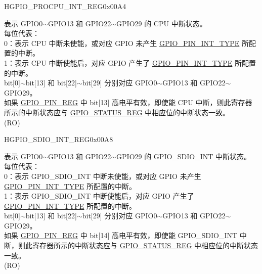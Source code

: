 \begin{register}{H}{GPIO\_PROCPU\_INT\_REG}{0x00A4}\label{regdesc:GPIOPROCPUINTREG}
%
\regnewline%
\begin{regdesc}\begin{reglist}
\label{fielddesc:GPIOPROCPUINT}\item [GPIO\_PROCPU\_INT] 表示 GPIO0$\sim$GPIO13 和 GPIO22$\sim$GPIO29 的 CPU 中断状态。\\ 
每位代表：\\
0：表示 CPU 中断未使能，或对应 GPIO 未产生 \hyperref[fielddesc:GPIOPINNINTTYPE]{GPIO\_PIN\_INT\_TYPE} 所配置的中断。\\
1：表示 CPU 中断使能后，对应 GPIO 产生了 \hyperref[fielddesc:GPIOPINNINTTYPE]{GPIO\_PIN\_INT\_TYPE} 所配置的中断。\\
bit[0]$\sim$bit[13] 和 bit[22]$\sim$bit[29] 分别对应 GPIO0$\sim$GPIO13 和 GPIO22$\sim$GPIO29。\\
如果 \hyperref[regdesc:GPIOPINNREG]{GPIO\_PIN\_REG} 中 bit[13] 高电平有效，即使能 CPU 中断，则此寄存器所示的中断状态应与 \hyperref[regdesc:GPIOSTATUSREG]{GPIO\_STATUS\_REG} 中相应位的中断状态一致。 \\ (RO)
\end{reglist}\end{regdesc}
\end{register}


\begin{register}{H}{GPIO\_SDIO\_INT\_REG}{0x00A8}\label{regdesc:GPIOSDIOINTREG}
%
\regnewline%
\begin{regdesc}\begin{reglist}
\label{fielddesc:GPIOSDIOINT}\item [GPIO\_SDIO\_INT] 表示 GPIO0$\sim$GPIO13 和 GPIO22$\sim$GPIO29 的 GPIO\_SDIO\_INT 中断状态。\\ 
每位代表：\\
0：表示 GPIO\_SDIO\_INT 中断未使能，或对应 GPIO 未产生 \hyperref[fielddesc:GPIOPINNINTTYPE]{GPIO\_PIN\_INT\_TYPE} 所配置的中断。\\
1：表示 GPIO\_SDIO\_INT 中断使能后，对应 GPIO 产生了 \hyperref[fielddesc:GPIOPINNINTTYPE]{GPIO\_PIN\_INT\_TYPE} 所配置的中断。\\
bit[0]$\sim$bit[13] 和 bit[22]$\sim$bit[29] 分别对应 GPIO0$\sim$GPIO13 和 GPIO22$\sim$GPIO29。\\
如果 \hyperref[regdesc:GPIOPINNREG]{GPIO\_PIN\_REG} 中 bit[14] 高电平有效，即使能 GPIO\_SDIO\_INT 中断，则此寄存器所示的中断状态应与 \hyperref[regdesc:GPIOSTATUSREG]{GPIO\_STATUS\_REG} 中相应位的中断状态一致。 \\ (RO)
\end{reglist}\end{regdesc}
\end{register}


